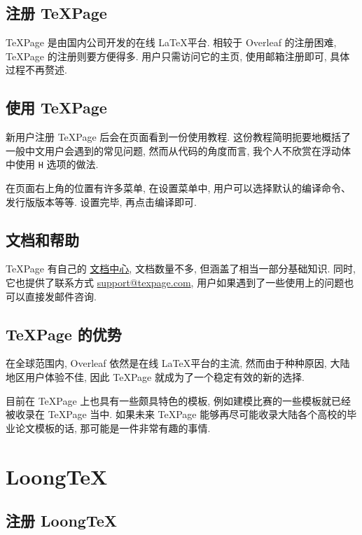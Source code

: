 \subsection{注册 TeXPage}

TeXPage 是由国内公司开发的在线 \LaTeX 平台.
相较于 Overleaf 的注册困难,
TeXPage 的注册则要方便得多.
用户只需访问它的主页,
使用邮箱注册即可,
具体过程不再赘述.

\subsection{使用 TeXPage}

新用户注册 TeXPage 后会在页面看到一份使用教程.
这份教程简明扼要地概括了一般中文用户会遇到的常见问题,
然而从代码的角度而言,
我个人不欣赏在浮动体中使用 \texttt{H} 选项的做法.

在页面右上角的位置有许多菜单,
在\textsf{设置}菜单中,
用户可以选择默认的编译命令、发行版版本等等.
设置完毕,
再点击编译即可.

\subsection{文档和帮助}

TeXPage 有自己的 \href{https://www.texpage.com/docs}{文档中心},
文档数量不多,
但涵盖了相当一部分基础知识.
同时,
它也提供了联系方式 \href{mailto:support@texpage.com}%
{\ttfamily support@texpage.com},
用户如果遇到了一些使用上的问题也可以直接发邮件咨询.

\subsection{TeXPage 的优势}

在全球范围内,
Overleaf 依然是在线 \LaTeX 平台的主流,
然而由于种种原因,
大陆地区用户体验不佳,
因此 TeXPage 就成为了一个稳定有效的新的选择.

目前在 TeXPage 上也具有一些颇具特色的模板,
例如建模比赛的一些模板就已经被收录在 TeXPage 当中.
如果未来 TeXPage 能够再尽可能收录大陆各个高校的毕业论文模板的话,
那可能是一件非常有趣的事情.

\section{LoongTeX}

\subsection{注册 LoongTeX}

